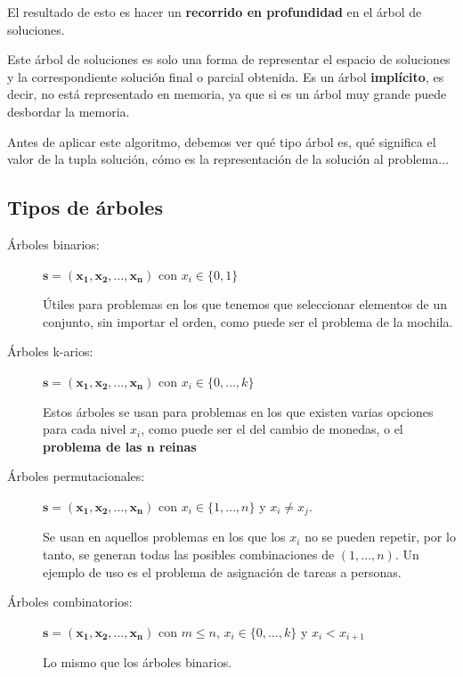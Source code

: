\documentclass[10pt,a4paper,spanish]{report}
\theoremstyle{definition}
\theoremstyle{remark}
\begin{document}
El resultado de esto es hacer un \textbf{\textcolor{electricgreen}{recorrido en profundidad}} en el árbol de soluciones.

Este árbol de soluciones es solo una forma de representar el espacio de soluciones y la correspondiente solución final o parcial obtenida. Es un árbol \textbf{\textcolor{electricgreen}{implícito}}, es decir, no está representado en memoria, ya que si es un árbol muy grande puede desbordar la memoria.

Antes de aplicar este algoritmo, debemos ver qué tipo árbol es, qué significa el valor de la tupla solución, cómo es la representación de la solución al problema$\ldots$

\newpage
\subsection{\textcolor{electricgreen}Tipos de árboles}
\label{arboles}
\begin{description}
    \item [Árboles binarios:] $\mathbf{s=(x_1,x_2,\ldots,x_n)}$ con $x_i\in \{0,1\}$
    \begin{center}
        
    \end{center}
    Útiles para problemas en los que tenemos que seleccionar elementos de un conjunto, sin importar el orden, como puede ser el problema de la mochila.

    \item [Árboles k-arios:] $\mathbf{s=(x_1,x_2,\ldots,x_n)}$ con $x_i\in \{0,\ldots,k\}$
    \begin{center}
        
    \end{center}
    Estos árboles se usan para problemas en los que existen varias opciones para cada nivel $x_i$, como puede ser el del cambio de monedas, o el \textbf{problema de las $\mathbf{n}$ reinas}

    \item [Árboles permutacionales:] $\mathbf{s=(x_1,x_2,\ldots,x_n)}$ con $x_i\in \{1,\ldots,n\}$ y $x_i \neq x_j$.
    \begin{center}
        
    \end{center}
    Se usan en aquellos problemas en los que los $x_i$ no se pueden repetir, por lo tanto, se generan todas las posibles combinaciones de $(1,\ldots,n)$. Un ejemplo de uso es el problema de asignación de tareas a personas.

    \item [Árboles combinatorios:] $\mathbf{s=(x_1,x_2,\ldots,x_n)}$ con $m\leq n$, $x_i\in \{0,\ldots,k\}$ y $x_i < x_{i+1}$
    \begin{center}
        
    \end{center}
    Lo mismo que los árboles binarios.
\end{description}
\end{document}
